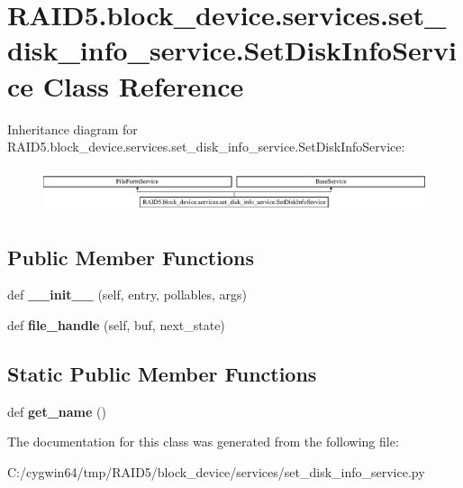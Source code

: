 \hypertarget{class_r_a_i_d5_1_1block__device_1_1services_1_1set__disk__info__service_1_1_set_disk_info_service}{}\section{R\+A\+I\+D5.\+block\+\_\+device.\+services.\+set\+\_\+disk\+\_\+info\+\_\+service.\+Set\+Disk\+Info\+Service Class Reference}
\label{class_r_a_i_d5_1_1block__device_1_1services_1_1set__disk__info__service_1_1_set_disk_info_service}
Inheritance diagram for R\+A\+I\+D5.\+block\+\_\+device.\+services.\+set\+\_\+disk\+\_\+info\+\_\+service.\+Set\+Disk\+Info\+Service\+:\begin{figure}[H]
\begin{center}
\leavevmode
\includegraphics[height=1.320755cm]{class_r_a_i_d5_1_1block__device_1_1services_1_1set__disk__info__service_1_1_set_disk_info_service}
\end{center}
\end{figure}
\subsection*{Public Member Functions}
\begin{DoxyCompactItemize}
\item 
\mbox{\label{class_r_a_i_d5_1_1block__device_1_1services_1_1set__disk__info__service_1_1_set_disk_info_service_a475d7ba1551735748b5a226e0113fbd7}} 
def {\bfseries \+\_\+\+\_\+init\+\_\+\+\_\+} (self, entry, pollables, args)
\item 
\mbox{\label{class_r_a_i_d5_1_1block__device_1_1services_1_1set__disk__info__service_1_1_set_disk_info_service_a800282607bae5d6545a1eb4e586ef02c}} 
def {\bfseries file\+\_\+handle} (self, buf, next\+\_\+state)
\end{DoxyCompactItemize}
\subsection*{Static Public Member Functions}
\begin{DoxyCompactItemize}
\item 
\mbox{\label{class_r_a_i_d5_1_1block__device_1_1services_1_1set__disk__info__service_1_1_set_disk_info_service_a72eea80f2a7dea81f2a9b3afcb0e67a2}} 
def {\bfseries get\+\_\+name} ()
\end{DoxyCompactItemize}


The documentation for this class was generated from the following file\+:\begin{DoxyCompactItemize}
\item 
C\+:/cygwin64/tmp/\+R\+A\+I\+D5/block\+\_\+device/services/set\+\_\+disk\+\_\+info\+\_\+service.\+py\end{DoxyCompactItemize}
